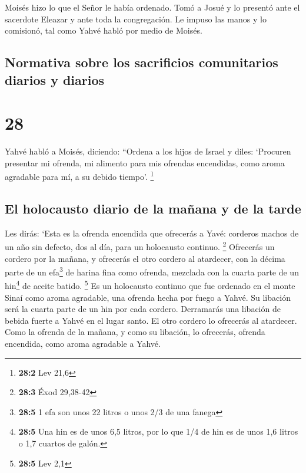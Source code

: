 Moisés hizo lo que el Señor le había ordenado. Tomó a
Josué y lo presentó ante el sacerdote Eleazar y ante toda la
congregación.  Le impuso las manos y lo comisionó, tal
como Yahvé habló por medio de Moisés.

\hypertarget{normativa-sobre-los-sacrificios-comunitarios-diarios-y-diarios}{%
\subsection{Normativa sobre los sacrificios comunitarios diarios y
diarios}\label{normativa-sobre-los-sacrificios-comunitarios-diarios-y-diarios}}

\hypertarget{section-27}{%
\section{28}\label{section-27}}

 Yahvé habló a Moisés, diciendo:  ``Ordena a
los hijos de Israel y diles: `Procuren presentar mi ofrenda, mi alimento
para mis ofrendas encendidas, como aroma agradable para mí, a su debido
tiempo'. \footnote{\textbf{28:2} Lev 21,6}

\hypertarget{el-holocausto-diario-de-la-mauxf1ana-y-de-la-tarde}{%
\subsection{El holocausto diario de la mañana y de la
tarde}\label{el-holocausto-diario-de-la-mauxf1ana-y-de-la-tarde}}

 Les dirás: `Esta es la ofrenda encendida que ofrecerás a
Yavé: corderos machos de un año sin defecto, dos al día, para un
holocausto continuo. \footnote{\textbf{28:3} Éxod 29,38-42}
 Ofrecerás un cordero por la mañana, y ofrecerás el otro
cordero al atardecer,  con la décima parte de un
efa\footnote{\textbf{28:5} 1 efa son unos 22 litros o unos 2/3 de una
  fanega} de harina fina como ofrenda, mezclada con la cuarta parte de
un hin\footnote{\textbf{28:5} Una hin es de unos 6,5 litros, por lo que
  1/4 de hin es de unos 1,6 litros o 1,7 cuartos de galón.} de aceite
batido. \footnote{\textbf{28:5} Lev 2,1}  Es un holocausto
continuo que fue ordenado en el monte Sinaí como aroma agradable, una
ofrenda hecha por fuego a Yahvé.  Su libación será la
cuarta parte de un hin por cada cordero. Derramarás una libación de
bebida fuerte a Yahvé en el lugar santo.  El otro cordero
lo ofrecerás al atardecer. Como la ofrenda de la mañana, y como su
libación, lo ofrecerás, ofrenda encendida, como aroma agradable a Yahvé.

